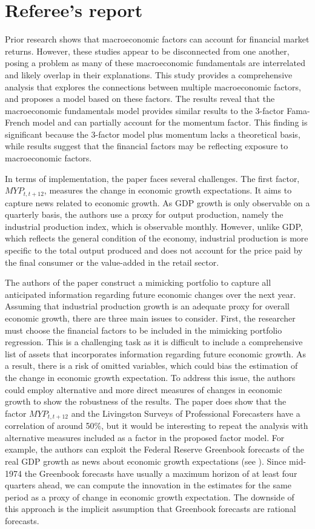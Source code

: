 \documentclass[12pt,a4paper]{ouparticle}
\begin{document}
\section{Referee's report}
Prior research shows that macroeconomic factors can account for financial market returns. However, these studies appear to be disconnected from one another, posing a problem as many of these macroeconomic fundamentals are interrelated and likely overlap in their explanations. This study provides a comprehensive analysis that explores the connections between multiple macroeconomic factors, and proposes a model based on these factors. The results reveal that the macroeconomic fundamentals model provides similar results to the 3-factor Fama-French model and can partially account for the momentum factor. This finding is significant because the 3-factor model plus momentum lacks a theoretical basis, while results suggest that the financial factors may be reflecting exposure to macroeconomic factors.

In terms of implementation, the paper faces several challenges. The first factor, $MYP_{t,t+12}$, measures the change in economic growth expectations. It aims to capture news related to economic growth. As GDP growth is only observable on a quarterly basis, the authors use a proxy for output production, namely the industrial production index, which is observable monthly. However, unlike GDP, which reflects the general condition of the economy, industrial production is more specific to the total output produced and does not account for the price paid by the final consumer or the value-added in the retail sector. 

The authors of the paper construct a mimicking portfolio to capture all anticipated information regarding future economic changes over the next year. Assuming that industrial production growth is an adequate proxy for overall economic growth, there are three main issues to consider. First, the researcher must choose the financial factors to be included in the mimicking portfolio regression. This is a challenging task as it is difficult to include a comprehensive list of assets that incorporates information regarding future economic growth. As a result, there is a risk of omitted variables, which could bias the estimation of the change in economic growth expectation. To address this issue, the authors could employ alternative and more direct measures of changes in economic growth to show the robustness of the results. The paper does show that the factor $MYP_{t,t+12}$ and the Livingston Surveys of Professional Forecasters have a correlation of around 50\%, but it would be interesting to repeat the analysis with alternative measures included as a factor in the proposed factor model. For example, the authors can exploit the Federal Reserve Greenbook forecasts of the real GDP growth as news about economic growth expectations (see \citealp{duffee2022macroeconomic}). Since mid-1974 the Greenbook forecasts have usually a maximum horizon of at least four quarters ahead, we can compute the innovation in the estimates for the same period as a proxy of change in economic growth expectation. The downside of this approach is the implicit assumption that Greenbook forecasts are rational forecasts.
\end{document}
